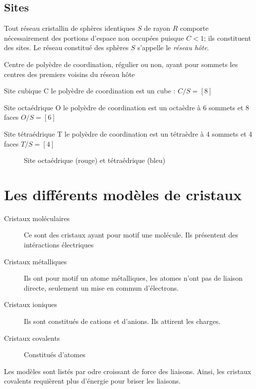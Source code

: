 \subsection{Sites}
Tout réseau cristallin de sphères identiques $S$ de rayon $R$ comporte
nécessairement des portions d'espace non occupées puisque $C < 1$; ils
constituent des sites. Le réseau constitué des sphères $S$ s'appelle le
\emph{réseau h\^ote}.
\begin{defi}
    Centre de polyèdre de coordination, régulier ou non, ayant pour sommets
    les centres des premiers voisins du réseau h\^ote
\end{defi}
\begin{ex}
    \begin{compactdesc}
        \item[Site cubique C] le polyèdre de coordination est un cube :
            $C/S = [8]$
        \item[Site octaédrique O] le polyèdre de coordination est un
            octaèdre à 6 sommets et 8 faces $O/S = [6]$
        \item[Site tétraédrique T] le polyèdre de coordination est un
            tétraèdre à 4 sommets et 4 faces $T/S = [4]$
    \end{compactdesc}
\end{ex}
\begin{figure}
    \centering
    
    \caption{Site octaédrique (rouge) et tétraédrique (bleu)}\label{fig:ex_sites}
\end{figure}


\section{Les différents modèles de cristaux}
\begin{description}
    \item[Cristaux moléculaires] Ce sont des cristaux ayant pour motif une
        molécule. Ils présentent des intéractions électriques
    \item[Cristaux métalliques] Ils ont pour motif un atome métalliques, les
        atomes n'ont pas de liaison directe, seulement un mise en commun
        d'électrons.
    \item[Cristaux ioniques] Ils sont constitués de cations et d'anions. Ils
        attirent les charges.
    \item[Cristaux covalents] Constitués d'atomes
\end{description}
Les modèles sont listés par odre croissant de force des liaisons. Ainsi, les
cristaux covalents requièrent plus d'énergie pour briser les liaisons.


